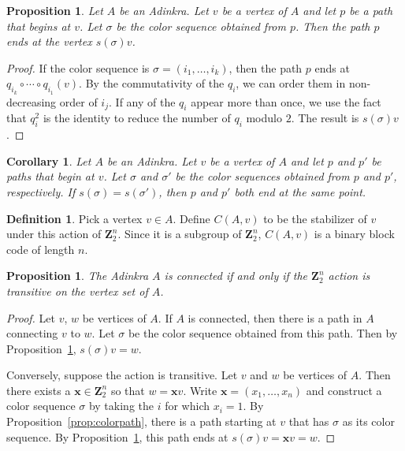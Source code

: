 \documentclass[12pt,twoside,singlespace]{article}
\numberwithin{equation}{section}
\newtheorem{cor}[equation]{Corollary}
\newtheorem{prop}[equation]{Proposition}
\theoremstyle{definition}
\newtheorem{definition}[equation]{Definition}
\newcommand{\ZZ}{\mathbf{Z}}
\renewcommand{\vec}[1]{\mathbf{#1}}
\begin{document}
\begin{prop}
\label{prop:colorendpath}
Let $A$ be an Adinkra.  Let $v$ be a vertex of $A$ and let $p$ be a path that begins at $v$.  Let $\sigma$ be the color sequence obtained from $p$.  Then the path $p$ ends at the vertex $s(\sigma)v$.
\end{prop}
\begin{proof}
If the color sequence is $\sigma=(i_1,\ldots,i_k)$, then the path $p$ ends at
$q_{i_k}\circ \cdots \circ q_{i_1}(v)$.  By the commutativity of the $q_i$, we can order them in non-decreasing order of $i_j$.  If any of the $q_i$ appear more than once, we use the fact that $q_i^2$ is the identity to reduce the number of $q_i$ modulo $2$.  The result is $s(\sigma)v$.
\end{proof}


\begin{cor}
\label{prop:pathands}
Let $A$ be an Adinkra.  Let $v$ be a vertex of $A$ and let $p$ and $p'$ be paths that begin at $v$.  Let $\sigma$ and $\sigma'$ be the color sequences obtained from $p$ and $p'$, respectively.  If $s(\sigma)=s(\sigma')$, then $p$ and $p'$ both end at the same point.
\end{cor}



\begin{definition}
Pick a vertex $v\in A$.  Define $C(A,v)$ to be the stabilizer of $v$ under this action of $\ZZ_2^n$.  Since it is a subgroup of $\ZZ_2^n$, $C(A,v)$ is a binary block code of length $n$.
\end{definition}

\begin{prop}
\label{prop:transitive}
The Adinkra $A$ is connected if and only if the $\ZZ_2^n$ action is transitive on the vertex set of $A$.
\end{prop}
\begin{proof}
Let $v$, $w$ be vertices of $A$.  If $A$ is connected, then there is a path in $A$ connecting $v$ to $w$.  Let $\sigma$ be the color sequence obtained from this path.  Then by Proposition~\ref{prop:colorendpath}, $s(\sigma)v=w$.

Conversely, suppose the action is transitive.  Let $v$ and $w$ be vertices of $A$.  Then there exists a $\vec{x}\in\ZZ_2^n$ so that $w=\vec{x}v$.  Write $\vec{x}=(x_1,\ldots,x_n)$ and construct a color sequence $\sigma$ by taking the $i$ for which $x_i=1$.  By Proposition~\ref{prop:colorpath}, there is a path starting at $v$ that has $\sigma$ as its color sequence.  By Proposition~\ref{prop:colorendpath}, this path ends at $s(\sigma)v=\vec{x}v=w$.
\end{proof}
\end{document}
